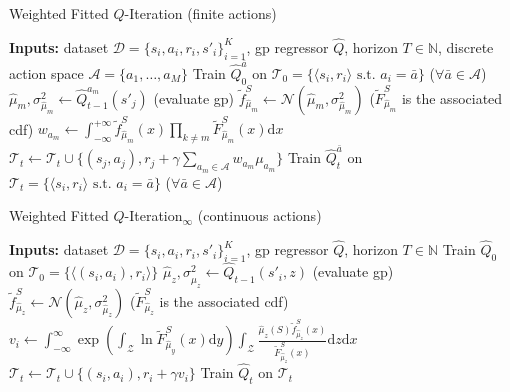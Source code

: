\begin{algorithm}[t]
\caption{Weighted Fitted $Q$-Iteration (finite actions)}
\label{A:WFQI}
\begin{small}
\begin{algorithmic} 
\STATE \textbf{Inputs:} dataset $\mathcal{D}=\{s_i,a_i,r_i,s'_i\}_{i=1}^{K}$, \gls{gp} regressor $\widehat{Q}$, horizon $T \in \mathbb{N}$, discrete action space $\mathcal{A} = \{a_1,\ldots, a_M\}$
\STATE Train $\widehat{Q}_0^{\bar a}$ on $\mathcal{T}_0 = \{\langle s_i, r_i\rangle  \text{ s.t. } a_i = \bar{a} \}$ ($\forall \bar{a} \in \mathcal{A}$)
\STATE $\hat{\mu}_{m}, \sigma^2_{\hat{\mu}_{m}} \leftarrow \widehat{Q}_{t-1}^{a_m}(s'_j)$ (evaluate \gls{gp})
\STATE $\tilde{f}_{\hat{\mu}_{m}}^S \leftarrow \mathcal{N}(\hat{\mu}_{m}, \sigma^2_{\hat{\mu}_m})$ ($\tilde{F}_{\hat{\mu}_{m}}^S$ is the associated \gls{cdf}) 
\STATE $w_{a_m} \leftarrow \int_{-\infty}^{+\infty} \tilde{f}_{\hat{\mu}_{m}}^S(x) \prod_{k\neq m} \tilde{F}^S_{\hat{\mu}_{m}}(x) \mathrm{d}x$
\ENDFOR
\STATE $\mathcal{T}_t \leftarrow \mathcal{T}_t \cup \{(s_j,a_j), r_j + \gamma \sum_{a_m \in \mathcal{A}} w_{a_m} \mu_{a_m}\}$
\ENDFOR
\STATE Train $\widehat{Q}_t^{\bar a}$ on $\mathcal{T}_t = \{\langle s_i, r_i\rangle  \text{ s.t. } a_i = \bar{a} \}$ ($\forall \bar{a} \in \mathcal{A}$)
\ENDFOR
\end{algorithmic}
\end{small}
\end{algorithm}

\begin{algorithm}[t]
\caption{Weighted Fitted $Q$-Iteration$_{\infty}$ (continuous actions)}
\label{A:continuousWFQI}
\begin{small}
\begin{algorithmic} 
\STATE \textbf{Inputs:} dataset $\mathcal{D}=\{s_i,a_i,r_i,s'_i\}_{i=1}^{K}$, \gls{gp} regressor $\widehat{Q}$, horizon $T \in \mathbb{N}$
\STATE Train $\widehat{Q}_0$ on $\mathcal{T}_0 = \{\langle (s_i, a_i), r_i\rangle \}$
\STATE $\hat{\mu}_{z}, \sigma^2_{\hat{\mu}_{z}} \leftarrow \widehat{Q}_{t-1}(s'_i, z)$ (evaluate \gls{gp})
\STATE $\tilde{f}_{\hat{\mu}_z}^S \leftarrow \mathcal{N}(\hat{\mu}_{z}, \sigma^2_{\hat{\mu}_z})$ ($\tilde{F}_{\hat{\mu}_z}^S$ is the associated \gls{cdf}) 
\STATE $v_i \leftarrow \int_{-\infty}^{\infty} \exp{\left( \int_{\mathcal{Z}} \ln \tilde{F}_{\hat{\mu}_y}^S(x)\mathrm{d}y \right)} \int_{\mathcal{Z}}  \frac{\hat{\mu}_z(S)  \tilde{f}_{\hat{\mu}_z}^S(x)}{\tilde{F}_{\hat{\mu}_z}^S(x)} \mathrm{d}z\mathrm{d}x$
\STATE $\mathcal{T}_t \leftarrow \mathcal{T}_t \cup \{(s_i,a_i), r_i + \gamma v_i\}$
\ENDFOR
\STATE Train $\widehat{Q}_t$ on $\mathcal{T}_t$
\ENDFOR
\end{algorithmic}
\end{small}
\end{algorithm}


